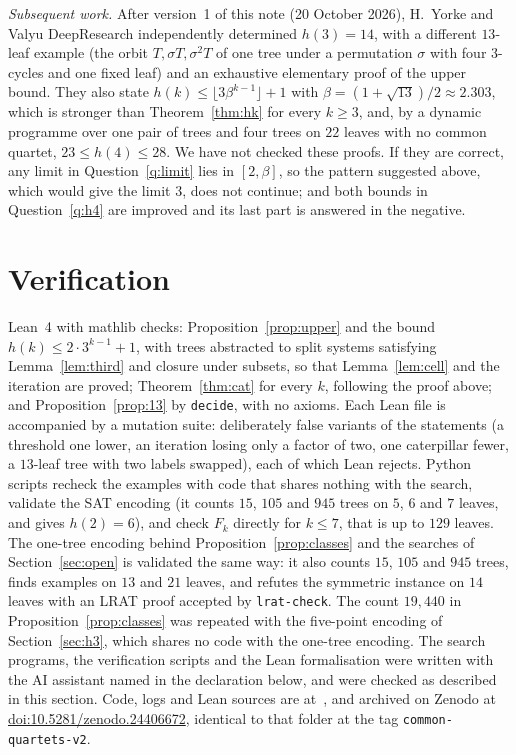\documentclass[11pt]{amsart}
\theoremstyle{definition}
\begin{document}
\emph{Subsequent work.} After version~1 of this note (20 October 2026), H.~Yorke and Valyu DeepResearch \cite{YV}
independently determined $h(3)=14$, with a different $13$-leaf example (the orbit $T,\sigma T,\sigma^2T$ of one tree
under a permutation $\sigma$ with four $3$-cycles and one fixed leaf) and an exhaustive elementary proof of the upper
bound. They also state $h(k)\le\lfloor3\beta^{k-1}\rfloor+1$ with $\beta=(1+\sqrt{13})/2\approx2.303$, which is
stronger than Theorem~\ref{thm:hk} for every $k\ge3$, and, by a dynamic programme over one pair of trees and four
trees on $22$ leaves with no common quartet, $23\le h(4)\le28$. We have not checked these proofs. If they are
correct, any limit in Question~\ref{q:limit} lies in $[2,\beta]$, so the pattern suggested above, which would give
the limit $3$, does not continue; and both bounds in Question~\ref{q:h4} are improved and its last part is answered
in the negative.

\section{Verification}\label{sec:verify}

Lean~4 with mathlib \cite{mathlib} checks: Proposition~\ref{prop:upper} and the bound $h(k)\le2\cdot3^{k-1}+1$, with
trees abstracted to split systems satisfying Lemma~\ref{lem:third} and closure under subsets, so that
Lemma~\ref{lem:cell} and the iteration are proved; Theorem~\ref{thm:cat} for every $k$, following the proof above;
and Proposition~\ref{prop:13} by \texttt{decide}, with no axioms. Each Lean file is accompanied by a mutation suite:
deliberately false variants of the statements (a threshold one lower, an iteration losing only a factor of two, one
caterpillar fewer, a $13$-leaf tree with two labels swapped), each of which Lean rejects. Python scripts recheck the
examples with code that shares nothing with the search, validate the SAT encoding (it counts $15$, $105$ and $945$
trees on $5$, $6$ and $7$ leaves, and gives $h(2)=6$), and check $F_k$ directly for $k\le7$, that is up to $129$
leaves. The one-tree encoding behind Proposition~\ref{prop:classes} and the searches of Section~\ref{sec:open} is
validated the same way: it also counts $15$, $105$ and $945$ trees, finds examples on $13$ and $21$ leaves, and refutes
the symmetric instance on $14$ leaves with an LRAT proof accepted by \texttt{lrat-check}. The count $19{,}440$ in
Proposition~\ref{prop:classes} was repeated with the five-point encoding of Section~\ref{sec:h3}, which shares no
code with the one-tree encoding. The search programs, the verification scripts and the
Lean formalisation were written with the AI assistant named in the declaration below, and were checked as described
in this section. Code, logs and Lean sources are at~\cite{repo}, and archived on Zenodo at
\href{https://doi.org/10.5281/zenodo.24406672}{doi:10.5281/zenodo.24406672}, identical to that folder at the tag
\texttt{common-quartets-v2}.
\end{document}
